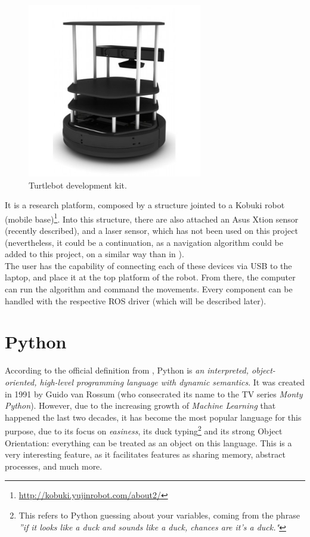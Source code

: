 		\begin{figure}[h]
			\centering
			\includegraphics[width=3in]{images/turtlebot}
			\caption{Turtlebot development kit.}
			\label{fig:3_turtlebot}
		\end{figure}
		
		It is a research platform, composed by a structure jointed to a Kobuki robot (mobile base)\footnote{\url{http://kobuki.yujinrobot.com/about2/}}. Into this structure, there are also attached an Asus Xtion sensor (recently described), and a laser sensor, which has not been used on this project (nevertheless, it could be a continuation, as a navigation algorithm could be added to this project, on a similar way than in \cite{rocapal}).\\
	
		The user has the capability of connecting each of these devices via USB to the laptop, and place it at the top platform of the robot. From there, the computer can run the algorithm and command the movements. Every component can be handled with the respective ROS driver (which will be described later).
	

\section{Python}
	According to the official definition from \cite{python}, Python is \textit{an interpreted, object-oriented, high-level programming language with dynamic semantics}. It was created in 1991 by Guido van Rossum (who consecrated its name to the TV series \textit{Monty Python}). However, due to the increasing growth of \emph{Machine Learning} that happened the last two decades, it has become the most popular language for this purpose, due to its focus on \emph{easiness}, its duck typing\footnote{This refers to Python guessing about your variables, coming from the phrase \textit{''if it looks like a duck and sounds like a duck, chances are it's a duck."}} and its strong Object Orientation: everything can be treated as an object on this language. This is a very interesting feature, as it facilitates features as sharing memory, abstract processes, and much more.
	
